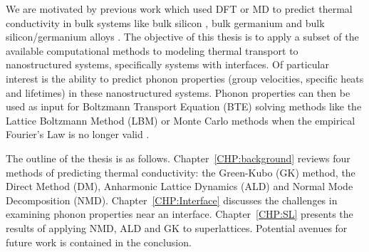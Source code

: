 We are motivated by previous work which used DFT or MD to predict thermal conductivity in bulk systems like bulk silicon \cite{PhysRevB.84.085204}, bulk germanium \cite{broido2007intrinsic} and bulk silicon/germanium alloys \cite{garg2011role}. The objective of this thesis is to apply a subset of the available computational methods to modeling thermal transport to nanostructured systems, specifically systems with interfaces. Of particular interest is the ability to predict phonon properties (group velocities, specific heats and lifetimes) in these nanostructured systems. Phonon properties can then be used as input for Boltzmann Transport Equation (BTE) solving methods like the Lattice Boltzmann Method (LBM) \cite{escobar2006multi,smith2006lattice,nabovati2011lattice} or Monte Carlo methods \cite{mazumder2001monte, lacroix2005monte, peraud2011efficient} when the empirical Fourier's Law is no longer valid \cite{cahill2003nanoscale}. %

The outline of the thesis is as follows. Chapter~\ref{CHP:background} reviews four methods of predicting thermal conductivity: the Green-Kubo (GK) method, the Direct Method (DM), Anharmonic Lattice Dynamics (ALD) and Normal Mode Decomposition (NMD). Chapter~\ref{CHP:Interface} discusses the challenges in examining phonon properties near an interface. Chapter~\ref{CHP:SL} presents the results of applying NMD, ALD and GK to superlattices. Potential avenues for future work is contained in the conclusion.

